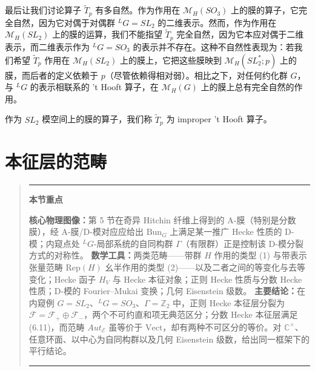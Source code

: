 \documentclass[11pt,a4paper]{article}
\newenvironment{keytakeaway}
  {\par\medskip\begin{quote}\small\noindent
   \rule{\linewidth}{0.6pt}\par\nopagebreak\smallskip\noindent
   \textbf{本节重点}\par\nobreak\smallskip\noindent\ignorespaces}
  {\par\smallskip\noindent\rule{\linewidth}{0.6pt}\end{quote}\medskip}
\newcommand{\Bun}{\mathrm{Bun}}
\begin{document}

最后让我们讨论算子 $\widetilde{T}_p$ 有多自然。作为作用在 $\mathcal{M}_H(SO_3)$ 上的膜的算子，它完全自然，因为它对偶于对偶群 ${}^{L}G=SL_2$ 的二维表示。然而，作为作用在 $\mathcal{M}_H(SL_2)$ 上的膜的运算，我们不能指望 $\widetilde{T}_p$ 完全自然，因为它本应对偶于二维表示，而二维表示作为 ${}^{L}G=SO_3$ 的表示并不存在。这种不自然性表现为：若我们希望 $\widetilde{T}_p$ 作用在 $\mathcal{M}_H(SL_2)$ 上的膜上，它把这些膜映到 $\mathcal{M}_H(SL_2^*;p)$ 上的膜，而后者的定义依赖于 $p$（尽管依赖得相对弱）。相比之下，对任何约化群 $G$，与 ${}^{L}G$ 的表示相联系的 't Hooft
算子，在 $\mathcal{M}_H(G)$ 上的膜上总有完全自然的作用。

作为 $SL_2$ 模空间上的膜的算子，我们称 $\widetilde{T}_p$ 为 improper 't Hooft 算子。



\section{本征层的范畴}

\begin{keytakeaway}
\textbf{核心物理图像：}第 5 节在奇异 Hitchin 纤维上得到的 A-膜（特别是分数膜），经 A-膜/D-模对应应给出 $\Bun_G$ 上满足某一推广 Hecke 性质的 D-模；内窥点处 ${}^LG$-局部系统的自同构群 $\Gamma$（有限群）正是控制该 D-模分裂方式的对称性。
\textbf{数学工具：}两类范畴——带群 $H$ 作用的类型 (1) 与带表示张量范畴 $\mathrm{Rep}(H)$ 幺半作用的类型 (2)——以及二者之间的等变化与去等变化；Hecke 函子 $H_V$ 与 Hecke 本征对象；正则 Hecke 性质与分数 Hecke 性质；D-模的 Fourier--Mukai 变换；几何 Eisenstein 级数。
\textbf{主要结论：}在内窥例 $G=SL_2$、${}^LG=SO_3$、$\Gamma=\mathbb{Z}_2$ 中，正则 Hecke 本征层分裂为 $\mathcal{F}=\mathcal{F}_+\oplus\mathcal{F}_-$，两个不可约直和项无典范区分；分数 Hecke 本征层满足 (6.11)，而范畴 $Aut_{\mathcal{E}}$ 虽等价于 $\mathrm{Vect}$，却有两种不可区分的等价。对 $\mathbb{C}^\times$、任意环面、以中心为自同构群以及几何 Eisenstein 级数，给出同一框架下的平行结论。
\end{keytakeaway}
\end{document}
